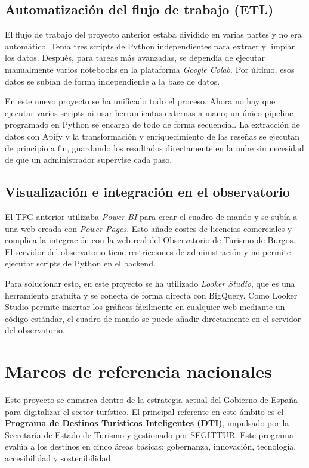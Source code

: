 \subsection{Automatización del flujo de trabajo (ETL)}
El flujo de trabajo del proyecto anterior estaba dividido en varias partes y no era automático. Tenía tres scripts de Python independientes para extraer y limpiar los datos. Después, para tareas más avanzadas, se dependía de ejecutar manualmente varios notebooks en la plataforma \textit{Google Colab}. Por último, esos datos se subían de forma independiente a la base de datos.

En este nuevo proyecto se ha unificado todo el proceso. Ahora no hay que ejecutar varios scripts ni usar herramientas externas a mano; un único pipeline programado en Python se encarga de todo de forma secuencial. La extracción de datos con Apify y la transformación y enriquecimiento de las reseñas se ejecutan de principio a fin, guardando los resultados directamente en la nube sin necesidad de que un administrador supervise cada paso.

\subsection{Visualización e integración en el observatorio}
El TFG anterior utilizaba \textit{Power BI} para crear el cuadro de mando y se subía a una web creada con \textit{Power Pages}. Esto añade costes de licencias comerciales y complica la integración con la web real del Observatorio de Turismo de Burgos. El servidor del observatorio tiene restricciones de administración y no permite ejecutar scripts de Python en el backend.

Para solucionar esto, en este proyecto se ha utilizado \textit{Looker Studio}, que es una herramienta gratuita y se conecta de forma directa con BigQuery. Como Looker Studio permite insertar los gráficos fácilmente en cualquier web mediante un código estándar, el cuadro de mando se puede añadir directamente en el servidor del observatorio.

\section{Marcos de referencia nacionales}

Este proyecto se enmarca dentro de la estrategia actual del Gobierno de España para digitalizar el sector turístico. El principal referente en este ámbito es el \textbf{Programa de Destinos Turísticos Inteligentes (DTI)}, impulsado por la Secretaría de Estado de Turismo y gestionado por SEGITTUR. Este programa evalúa a los destinos en cinco áreas básicas: gobernanza, innovación, tecnología, accesibilidad y sostenibilidad.

